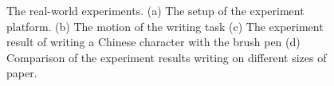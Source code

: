 \documentclass[conference]{IEEEtran}
\begin{document}
\begin{figure}[!t]
    \centering
    \quad
    \caption{The real-world experiments. (a) The setup of the experiment platform. (b) The motion of the writing task (c) The experiment result of writing a Chinese character with the brush pen (d) Comparison of the experiment results writing on different sizes of paper.}
    \label{fig8}
\end{figure}
\end{document}
